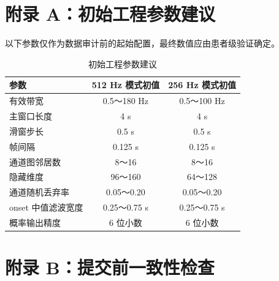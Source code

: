 \clearpage
\appendix
\setcounter{section}{1}
\setcounter{table}{0}
\section*{附录 A：初始工程参数建议}

以下参数仅作为数据审计前的起始配置，最终数值应由患者级验证确定。

\begin{table}[htbp]
    \centering
    \small
    \caption{初始工程参数建议}
    \label{tab:initial-params}
    \renewcommand{\arraystretch}{1.25}
    \setlength{\tabcolsep}{5pt}
    \begin{tabular}{@{}lcc@{}}
        \toprule
        \textbf{参数} & \textbf{512 Hz 模式初值} & \textbf{256 Hz 模式初值} \\
        \midrule
        有效带宽 & 0.5～180 Hz & 0.5～100 Hz \\
        主窗口长度 & 4 s & 4 s \\
        滑窗步长 & 0.5 s & 0.5 s \\
        帧间隔 & 0.125 s & 0.125 s \\
        通道图邻居数 & 8～16 & 8～16 \\
        隐藏维度 & 96～160 & 64～128 \\
        通道随机丢弃率 & 0.05～0.20 & 0.05～0.20 \\
        onset 中值滤波宽度 & 0.25～0.75 s & 0.25～0.75 s \\
        概率输出精度 & 6 位小数 & 6 位小数 \\
        \bottomrule
    \end{tabular}
\end{table}

\setcounter{section}{2}
\clearpage
\section*{附录 B：提交前一致性检查}

